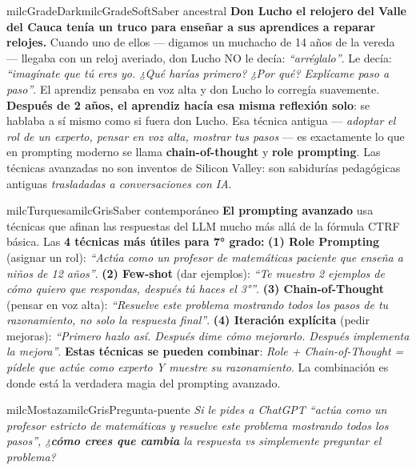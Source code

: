 \documentclass[11pt,letterpaper]{article}
\begin{document}
\begin{softbox}{milcGradeDark}{milcGradeSoft}{Saber ancestral}
\textbf{Don Lucho el relojero del Valle del Cauca tenía un truco para enseñar a sus aprendices a reparar relojes.} Cuando uno de ellos --- digamos un muchacho de 14 años de la vereda --- llegaba con un reloj averiado, don Lucho NO le decía: \emph{``arréglalo''}. Le decía: \emph{``imagínate que tú eres yo. ¿Qué harías primero? ¿Por qué? Explícame paso a paso''}. El aprendiz pensaba en voz alta y don Lucho lo corregía suavemente. \textbf{Después de 2 años, el aprendiz hacía esa misma reflexión solo}: se hablaba a sí mismo como si fuera don Lucho. Esa técnica antigua --- \emph{adoptar el rol de un experto, pensar en voz alta, mostrar tus pasos} --- es exactamente lo que en prompting moderno se llama \textbf{chain-of-thought} y \textbf{role prompting}. Las técnicas avanzadas no son inventos de Silicon Valley: son sabidurías pedagógicas antiguas \emph{trasladadas a conversaciones con IA}.
\end{softbox}

\begin{softbox}{milcTurquesa}{milcGris}{Saber contemporáneo}
\textbf{El prompting avanzado} usa técnicas que afinan las respuestas del LLM mucho más allá de la fórmula CTRF básica. Las \textbf{4 técnicas más útiles para 7° grado:} \textbf{(1) Role Prompting} (asignar un rol): \emph{``Actúa como un profesor de matemáticas paciente que enseña a niños de 12 años''}. \textbf{(2) Few-shot} (dar ejemplos): \emph{``Te muestro 2 ejemplos de cómo quiero que respondas, después tú haces el 3°''}. \textbf{(3) Chain-of-Thought} (pensar en voz alta): \emph{``Resuelve este problema mostrando todos los pasos de tu razonamiento, no solo la respuesta final''}. \textbf{(4) Iteración explícita} (pedir mejoras): \emph{``Primero hazlo así. Después dime cómo mejorarlo. Después implementa la mejora''}. \textbf{Estas técnicas se pueden combinar}: \emph{Role + Chain-of-Thought = pídele que actúe como experto Y muestre su razonamiento}. La combinación es donde está la verdadera magia del prompting avanzado.
\end{softbox}

\begin{softbox}{milcMostaza}{milcGris}{Pregunta-puente}
\textit{Si le pides a ChatGPT \emph{``actúa como un profesor estricto de matemáticas y resuelve este problema mostrando todos los pasos''}, ¿\textbf{cómo crees que cambia} la respuesta vs simplemente preguntar el problema?}
\end{softbox}
\end{document}
